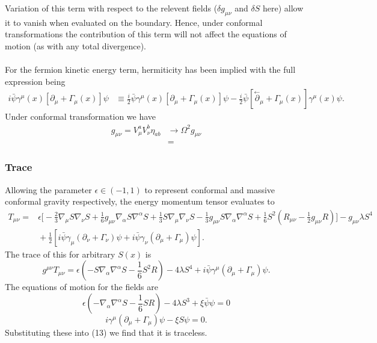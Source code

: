 \documentclass[10pt,letterpaper]{article}
\numberwithin{equation}{subsection}
\begin{document}
Variation of this term with respect to the relevent fields ($\delta g_{\mu\nu}$ and $\delta S$ here) allow it to vanish when evaluated on the boundary. Hence, under conformal transformations the contribution of this term will not affect the equations of motion (as with any total divergence). 
\\ \\
\noindent
For the fermion kinetic energy term, hermiticity has been implied with the full expression being
\begin{align}
i\bar\psi \gamma^\mu(x)[\partial_\mu+ \Gamma_\mu(x)]\psi &\equiv \frac{i}{2} \bar \psi\gamma^\mu(x)[\partial_\mu + \Gamma_{\mu}(x)]\psi - \frac{i}{2}
\bar\psi[\overset{\leftarrow}\partial_\mu +\Gamma_\mu(x)]\gamma^\mu(x)\psi.
\end{align}
Under conformal transformation we have 
\begin{align}
g_{\mu\nu} = V^{a}_\mu V^b_\nu \eta_{ab} &\to \Omega^2 g_{\mu\nu}
\nonumber\\
&= 
\end{align}


\subsubsection{Trace}
Allowing the parameter $\epsilon \in (-1,1)$ to represent conformal and massive conformal gravity respectively, the energy momentum tensor evaluates to
\begin{align}
	T_{\mu\nu} =&{}
	 \epsilon\bigg[ -\frac23 \nabla_\mu S\nabla_\nu S + \frac16 g_{\mu\nu} \nabla_\alpha S\nabla^\alpha S + \frac13
	S \nabla_\mu \nabla_\nu S -\frac13 g_{\mu\nu} S\nabla_\alpha\nabla^\alpha S+ \frac16 S^2\left( R_{\mu\nu} - \frac12 g_{\mu\nu}R\right)\bigg] - g_{\mu\nu}\lambda S^4
\nonumber\\
&{} +\frac12 \left[ i\bar\psi \gamma_\mu(\partial_\nu +\Gamma_\nu)\psi +  i\bar\psi \gamma_\nu(\partial_\mu +\Gamma_\mu)\psi\right].
\end{align}
The trace of this for arbitrary $S(x)$ is
\begin{equation}
	g^{\mu\nu} T_{\mu\nu} = \epsilon\left( - S \nabla_\alpha \nabla^\alpha S - \frac16 S^2 R\right) - 4\lambda S^4 + i \bar\psi \gamma^\mu(\partial_\mu
	+\Gamma_\mu)\psi.
\end{equation}
The equations of motion for the fields are
\begin{equation}
	\epsilon\left( -\nabla_\alpha \nabla^\alpha S -\frac16 S R\right) - 4\lambda S^3 + \xi \bar\psi\psi = 0
\end{equation}
\begin{equation}
i\gamma^\mu(\partial_\mu +\Gamma_\mu)\psi - \xi S\psi = 0.
\end{equation}
Substituting these into (13) we find that it is traceless.
\end{document}
